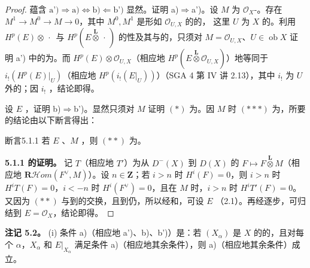 \begin{proof}
蕴含 $\text{a')}\Rightarrow\text{a)}\Longleftrightarrow\text{b)}\Longleftarrow\text{b')}$ 显然。证明 a)$\Rightarrow$a')。设 $M$ 为 $\mathcal O_X$-。存在 $M^1\to M^0\to M\to0$，其中 $M^0,M^1$ 是形如 $\mathcal O_{U,X}$ 的的，
这里 $U$ 为 $X$ 的。利用 $H^p(E)\otimes\,\cdot\,$ 与 $H^p(E\mathbin{\overset{\mathbf L}{\otimes}}\,\cdot\,)$ 的性及其与的，只须对 $M=\mathcal O_{U,X}$、$U\in\operatorname{ob}X$ 证明 a') 中的为。而 $H^p(E)\otimes\mathcal O_{U,X}$（相应地 $H^p(E\mathbin{\overset{\mathbf L}{\otimes}}\mathcal O_{U,X})$）地等同于 $i_!(H^p(E)|_U)$（相应地 $H^p(i_!(E|_U))$）（SGA 4 第 IV 讲 2.13），其中 $i_!$ 为 $U$ 外的；因 $i_!$ ，结论即得。

设 $E$ ，证明 b)$\Rightarrow$b')。显然只须对 $M$ 证明 $(*)$ 为。因 $M$ 时 $(***)$ 为，所要的结论由以下断言得出：
\begin{SGAresult}{断言}{5.1.1}
若 $E$ 、$M$ ，则 $(**)$ 为。
\end{SGAresult}
\textbf{5.1.1 的证明。} 记 $T$（相应地 $T'$）为从 $D^-(X)$ 到 $D(X)$ 的 $F\mapsto F\mathbin{\overset{\mathbf L}{\otimes}}M$（相应地 $\mathbf R\mathcal Hom(F^\vee,M)$）。设 $n\in\mathbf Z$；若 $i>n$ 时 $H^i(F)=0$，则 $i>n$ 时 $H^iT(F)=0$，$i<-n$ 时 $H^i(F^\vee)=0$，且在 $M$ 时，$i>n$ 时 $H^iT'(F)=0$。又因为 $(**)$ 与到的交换，且到仍，所以经和，可设 $E$ （2.1）。再经逐步，可归结到 $E=\mathcal O_X$，结论即得。
\end{proof}
\textbf{注记 5.2。} (i) 条件 a)（相应地 a')、b)、b')）是：若 $(X_\alpha)$ 是 $X$ 的的，且对每个 $\alpha$，$X_\alpha$ 和 $E|_{X_\alpha}$ 满足条件 a)（相应地其余条件），则 a)（相应地其余条件）成立。

